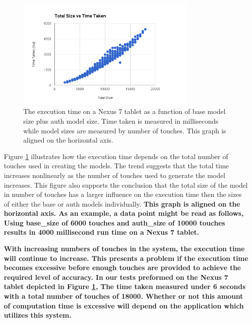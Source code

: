 \documentclass{acm_proc_article-sp}
\begin{document}
\begin{figure}
\centering
\includegraphics[width=3.5in]{nexus_total_size_time.png}
\caption{The execution time  on a Nexus 7 tablet as a function of base model size plus auth model size.
Time taken is measured in milliseconds while model sizes are measured by number of touches.
This graph is aligned on the horizontal axis.}
\label{fig:nexus_total_size_time}
\end{figure}

Figure \ref{fig:nexus_total_size_time} illustrates how the execution time depends on the total number of touches used in creating the models. The trend suggests that the total  time  increases 
nonlinearly as the number of touches used to generate the model increases.
This figure also supports the conclusion that the total size of the model in number of touches has a larger influence on the execution time then the sizes of either the base or auth models individually.
\textbf{
This graph is aligned on the horizontal axis.
As an example, a data point might be read as follows,
Using base\_size of 6000 touches and
auth\_size of 10000 touches results in
4000 millisecond run time on a Nexus 7 tablet.
}

\textbf{
With increasing numbers of touches in the system, 
the execution time will continue to increase.
This presents a problem if the execution time becomes
excessive before enough touches are provided to achieve the required level of accuracy.
In our tests preformed on the Nexus 7 tablet depicted in Figure \ref{fig:nexus_total_size_time},
The time taken measured under 6 seconds
with a total number of touches of 18000.
Whether or not this amount of computation time is excessive
will depend on the application which utilizes this system.
}

\end{document}
